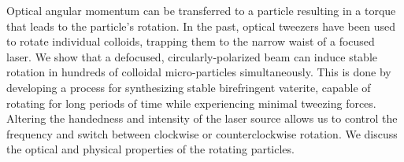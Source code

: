 Optical angular momentum can be transferred to a particle resulting in a torque that leads to the particle's rotation. In the past, optical tweezers have been used to rotate individual colloids, trapping them to the narrow waist of a focused laser. We show that a defocused, circularly-polarized beam can induce stable rotation in hundreds of colloidal micro-particles simultaneously. This is done by developing a process for synthesizing stable birefringent vaterite, capable of rotating for long periods of time while experiencing minimal tweezing forces. Altering the handedness and intensity of the laser source allows us to control the frequency and switch between clockwise or counterclockwise rotation. We discuss the optical and physical properties of the rotating particles.